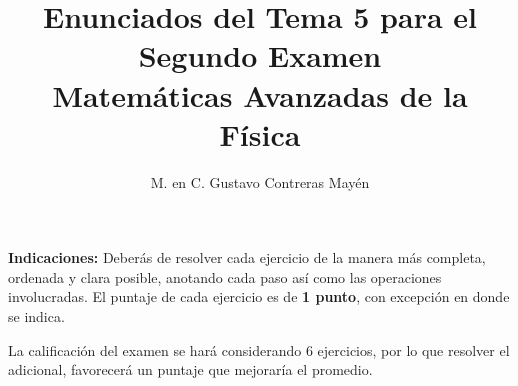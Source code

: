 
\title{Enunciados del Tema 5 para el Segundo Examen \\[0.3em]  \large{Matemáticas Avanzadas de la Física}\vspace{-3ex}}
\author{M. en C. Gustavo Contreras Mayén}
\date{ }

\vspace{-4cm}
\maketitle
\fontsize{14}{14}\selectfont

\textbf{Indicaciones: } Deberás de resolver cada ejercicio de la manera más completa, ordenada y clara posible, anotando cada paso así como las operaciones involucradas. El puntaje de cada ejercicio es de \textbf{1 punto}, con excepción en donde se indica.
\par
La calificación del examen se hará considerando 6 ejercicios, por lo que resolver el adicional, favorecerá un puntaje que mejoraría el promedio.


